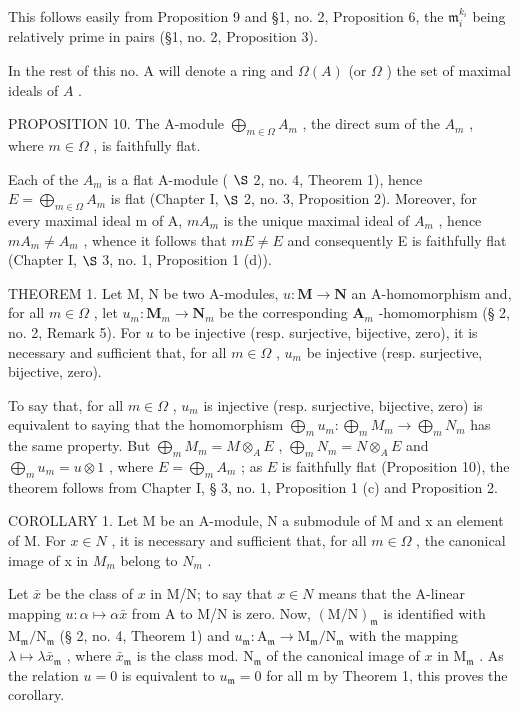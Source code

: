 This follows easily from Proposition 9 and §1, no. 2, Proposition 6, the \(\mathfrak{m}_{i}^{k_{i}}\) being relatively prime in pairs (§1, no. 2, Proposition 3).

In the rest of this no. A will denote a ring and \(\Omega(A)\) (or \(\Omega\) ) the set of maximal ideals of \(A\) .

PROPOSITION 10. The A-module \(\bigoplus_{m\in\Omega}A_m\) , the direct sum of the \(A_m\) , where \(m\in\Omega\) , is faithfully flat.

Each of the \(A_{m}\) is a flat A-module ( \(\S\) 2, no. 4, Theorem 1), hence \(E = \bigoplus_{m \in \Omega} A_{m}\) is flat (Chapter I, \(\S\) 2, no. 3, Proposition 2). Moreover, for every maximal ideal m of A, \(mA_{m}\) is the unique maximal ideal of \(A_{m}\) , hence \(mA_{m} \neq A_{m}\) , whence it follows that \(mE \neq E\) and consequently E is faithfully flat (Chapter I, \(\S\) 3, no. 1, Proposition 1 (d)).

THEOREM 1. Let M, N be two A-modules, \(u: \mathbf{M} \to \mathbf{N}\) an A-homomorphism and, for all \(m \in \Omega\) , let \(u_m: \mathbf{M}_m \to \mathbf{N}_m\) be the corresponding \(\mathbf{A}_m\) -homomorphism (§ 2, no. 2, Remark 5). For \(u\) to be injective (resp. surjective, bijective, zero), it is necessary and sufficient that, for all \(m \in \Omega\) , \(u_m\) be injective (resp. surjective, bijective, zero).

To say that, for all \(m \in \Omega\) , \(u_m\) is injective (resp. surjective, bijective, zero) is equivalent to saying that the homomorphism \(\bigoplus_{m} u_m: \bigoplus_{m} M_m \to \bigoplus_{m} N_m\) has the same property. But \(\bigoplus_{m} M_m = M \otimes_A E\) , \(\bigoplus_{m} N_m = N \otimes_A E\) and \(\bigoplus_{m} u_m = u \otimes 1\) , where \(E = \bigoplus_{m} A_m\) ; as \(E\) is faithfully flat (Proposition 10), the theorem follows from Chapter I, § 3, no. 1, Proposition 1 (c) and Proposition 2.

COROLLARY 1. Let M be an A-module, N a submodule of M and x an element of M. For \(x \in N\) , it is necessary and sufficient that, for all \(m \in \Omega\) , the canonical image of x in \(M_{m}\) belong to \(N_{m}\) .

Let \(\bar{x}\) be the class of \(x\) in M/N; to say that \(x \in N\) means that the A-linear mapping \(u: \alpha \mapsto \alpha \bar{x}\) from A to M/N is zero. Now, \((\mathrm{M} / \mathrm{N})_{\mathfrak{m}}\) is identified with \(\mathrm{M}_{\mathfrak{m}} / \mathrm{N}_{\mathfrak{m}}\) (§ 2, no. 4, Theorem 1) and \(u_{\mathfrak{m}}: \mathrm{A}_{\mathfrak{m}} \to \mathrm{M}_{\mathfrak{m}} / \mathrm{N}_{\mathfrak{m}}\) with the mapping \(\lambda \mapsto \lambda \bar{x}_{\mathfrak{m}}\) , where \(\bar{x}_{\mathfrak{m}}\) is the class mod. \(\mathrm{N}_{\mathfrak{m}}\) of the canonical image of \(x\) in \(\mathrm{M}_{\mathfrak{m}}\) . As the relation \(u = 0\) is equivalent to \(u_{\mathfrak{m}} = 0\) for all m by Theorem 1, this proves the corollary.

